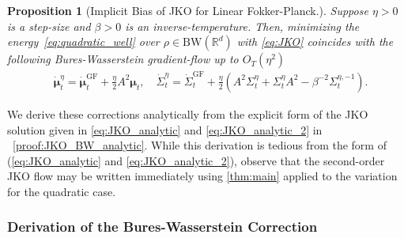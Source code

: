 \documentclass[reqno,11pt,letterpaper]{amsart}
\theoremstyle{plain}
\newtheorem{prop}{Proposition}
\theoremstyle{definition}
\theoremstyle{remark}
\newcommand{\wass}{\mathrm{GF}}
\begin{document}
\begin{prop}[Implicit Bias of JKO for Linear Fokker-Planck.]\label{prop:JKO_FP}
    Suppose $\eta > 0$ is a step-size and $\beta > 0$ is an inverse-temperature. Then, minimizing the energy~\ref{eq:quadratic_well} over $\rho \in \mathrm{BW}(\mathbb{R}^{d})$ with \eqref{eq:JKO} coincides with the following Bures-Wasserstein gradient-flow up to $O_{T}(\eta^{2})$
    \begin{align}
        &\dot{\bm{\mu}}_{t}^{\eta} = 
        \dot{\bm{\mu}}_{t}^{\wass} + \frac{\eta}{2} A^{2}\bm{\mu}_{t} , \quad \dot{\Sigma}_{t}^{\eta} = \dot{\Sigma}_{t}^{\wass} + \frac{\eta}{2}  \left(
        A^{2} \Sigma_{t}^{\eta} + \Sigma_{t}^{\eta} A^{2} - \beta^{-2} \Sigma_{t}^{\eta,-1}
        \right) .
    \end{align}
\end{prop}
We derive these corrections analytically from the explicit form of the JKO solution given in \eqref{eq:JKO_analytic} and \eqref{eq:JKO_analytic_2} in ~\ref{proof:JKO_BW_analytic}. While this derivation is tedious from the form of \cite{Halder2017} (\eqref{eq:JKO_analytic} and \eqref{eq:JKO_analytic_2}), observe that the second-order JKO flow may be written immediately using \ref{thm:main} applied to the variation for the quadratic case.

\subsubsection{Derivation of the Bures-Wasserstein Correction}
\end{document}
